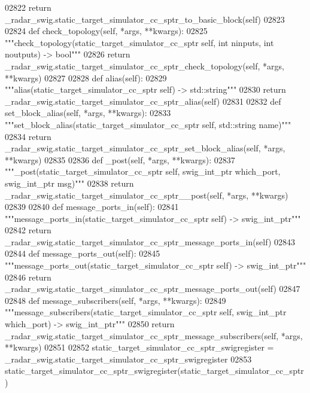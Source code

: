 \begin{DoxyCode}
{{{{{{{{{{02822         \textcolor{keywordflow}{return} \_radar\_swig.static\_target\_simulator\_cc\_sptr\_to\_basic\_block(self)
02823 
02824     \textcolor{keyword}{def }check_topology(self, *args, **kwargs):
02825         \textcolor{stringliteral}{"""check\_topology(static\_target\_simulator\_cc\_sptr self, int ninputs, int noutputs) -> bool"""}
02826         \textcolor{keywordflow}{return} \_radar\_swig.static\_target\_simulator\_cc\_sptr\_check\_topology(self, *args, **kwargs)
02827 
02828     \textcolor{keyword}{def }alias(self):
02829         \textcolor{stringliteral}{"""alias(static\_target\_simulator\_cc\_sptr self) -> std::string"""}
02830         \textcolor{keywordflow}{return} \_radar\_swig.static\_target\_simulator\_cc\_sptr\_alias(self)
02831 
02832     \textcolor{keyword}{def }set_block_alias(self, *args, **kwargs):
02833         \textcolor{stringliteral}{"""set\_block\_alias(static\_target\_simulator\_cc\_sptr self, std::string name)"""}
02834         \textcolor{keywordflow}{return} \_radar\_swig.static\_target\_simulator\_cc\_sptr\_set\_block\_alias(self, *args, **kwargs)
02835 
02836     \textcolor{keyword}{def }_post(self, *args, **kwargs):
02837         \textcolor{stringliteral}{"""\_post(static\_target\_simulator\_cc\_sptr self, swig\_int\_ptr which\_port, swig\_int\_ptr msg)"""}
02838         \textcolor{keywordflow}{return} \_radar\_swig.static\_target\_simulator\_cc\_sptr\_\_post(self, *args, **kwargs)
02839 
02840     \textcolor{keyword}{def }message_ports_in(self):
02841         \textcolor{stringliteral}{"""message\_ports\_in(static\_target\_simulator\_cc\_sptr self) -> swig\_int\_ptr"""}
02842         \textcolor{keywordflow}{return} \_radar\_swig.static\_target\_simulator\_cc\_sptr\_message\_ports\_in(self)
02843 
02844     \textcolor{keyword}{def }message_ports_out(self):
02845         \textcolor{stringliteral}{"""message\_ports\_out(static\_target\_simulator\_cc\_sptr self) -> swig\_int\_ptr"""}
02846         \textcolor{keywordflow}{return} \_radar\_swig.static\_target\_simulator\_cc\_sptr\_message\_ports\_out(self)
02847 
02848     \textcolor{keyword}{def }message_subscribers(self, *args, **kwargs):
02849         \textcolor{stringliteral}{"""message\_subscribers(static\_target\_simulator\_cc\_sptr self, swig\_int\_ptr which\_port) ->
       swig\_int\_ptr"""}
02850         \textcolor{keywordflow}{return} \_radar\_swig.static\_target\_simulator\_cc\_sptr\_message\_subscribers(self, *args, **kwargs)
02851 
02852 static\_target\_simulator\_cc\_sptr\_swigregister = \_radar\_swig.static\_target\_simulator\_cc\_sptr\_swigregister
02853 static_target_simulator_cc_sptr_swigregister(static\_target\_simulator\_cc\_sptr)
}}}}}}}}}}
\end{DoxyCode}
